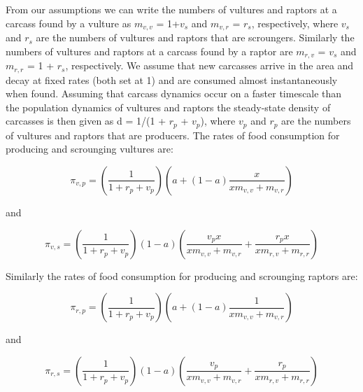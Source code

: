 From our assumptions we can write the numbers of vultures and raptors at a carcass found by a vulture as $m_{v,v}$ = 1+$v_s$ and $m_{v,r}$ = $r_s$, respectively, where $v_s$ and $r_s$ are the numbers of vultures and raptors that are scroungers. Similarly the numbers of vultures and raptors at a carcass found by a raptor are $m_{r,v}$ = $v_s$ and $m_{r,r}$ = 1 + $r_s$, respectively. We assume that new carcasses arrive in the area and decay at fixed rates (both set at 1) and are consumed almost instantaneously when found. Assuming that carcass dynamics occur on a faster timescale than the population dynamics of vultures and raptors the steady-state density of carcasses is then given as d = 1/(1 + $r_p$ + $v_p$), where $v_p$ and $r_p$ are the numbers of vultures and raptors that are producers. The rates of food consumption for producing and scrounging vultures are:

\begin{equation}
\pi _{v,p} = \left ( \frac{1}{1+r_{p}+v_{p}} \right )\left ( a+(1-a)\frac{x}{xm_{v,v} + m_{v,r}} \right )
\end{equation}

and

\begin{equation}%
\pi _{v,s} = \left ( \frac{1}{1+r_{p}+v_{p}} \right ) \left ( 1-a \right ) \left (\frac{v_{p}x}{xm_{v,v} + m_{v,r} }+\frac{r_{p}x}{xm_{r,v}+m_{r,r}}\right)
\end{equation}

Similarly the rates of food consumption for producing and scrounging raptors are:

\begin{equation}
\pi _{r,p} = \left ( \frac{1}{1+r_{p}+v_{p}} \right )\left ( a+(1-a)\frac{1}{xm_{v,v} + m_{v,r}} \right )
\end{equation}

and

\begin{equation}
\pi _{r,s} = \left ( \frac{1}{1+r_{p}+v_{p}} \right ) \left ( 1-a \right ) \left (\frac{v_{p}}{xm_{v,v} + m_{v,r} }+\frac{r_{p}}{xm_{r,v}+m_{r,r}}\right)
\end{equation}

\vspace{10 mm}

